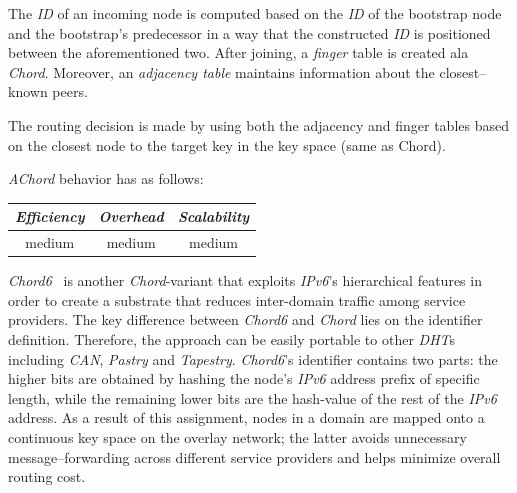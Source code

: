 The \emph{ID} of an incoming 
node is computed based on the \emph{ID} of the bootstrap node 
and the bootstrap's predecessor in a way that the constructed 
\emph{ID} is positioned between the aforementioned two. 
After joining, a \emph{finger} table is created ala \emph{Chord}. 
Moreover, an \emph{adjacency table} maintains 
information about the closest--known peers. 

The routing decision is made by using both the adjacency and finger tables
based on the closest node to the target key in the key space (same as
Chord).

\emph{AChord} behavior has as follows:
\begin{center}
{\footnotesize
\begin{tabular}{ccc}
\emph{Efficiency} & \emph{Overhead} & \emph{Scalability} \\
\hline
medium &
medium &
medium
\end{tabular}
}
\end{center}

\emph{Chord6}~\cite{XZHL2005} is another \emph{Chord}-variant that
exploits {\sl IPv6}'s  hierarchical features in order to create 
a substrate that reduces inter-domain traffic among service providers. 
The key difference between
\emph{Chord6} and \emph{Chord} lies on the identifier definition. 
Therefore, the approach can be easily portable to other 
\emph{DHT}s including \emph{CAN}, \emph{Pastry} and \emph{Tapestry}. 
\emph{Chord6}'s identifier contains two parts: 
the higher bits are obtained by hashing the
node's {\sl IPv6} address prefix of specific length, 
while the remaining lower bits are the hash-value 
of the rest of the {\sl IPv6} address. 
As a result of this assignment, nodes in a domain are mapped 
onto a continuous key space on the overlay network;
the latter avoids unnecessary message--forwarding across different
service providers and helps minimize overall routing cost.


